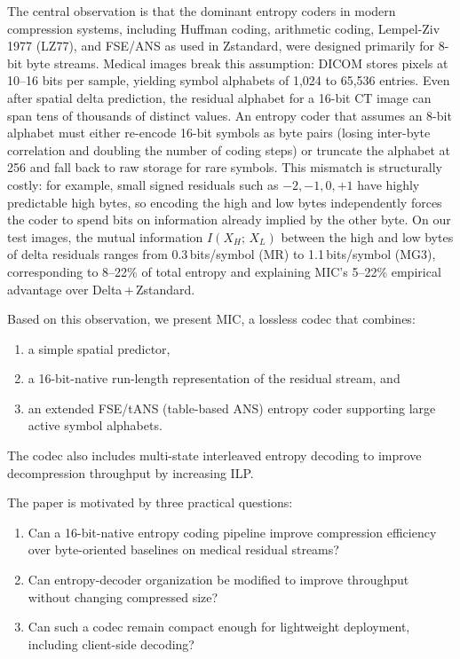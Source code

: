 \documentclass[journal]{IEEEtran}
\begin{document}
The central observation is that the dominant entropy coders in modern
compression systems, including Huffman coding, arithmetic coding, Lempel-Ziv
1977 (LZ77), and FSE/ANS as used in Zstandard, were designed primarily for
8-bit byte streams. Medical images break this assumption: DICOM stores pixels
at 10--16 bits per sample, yielding symbol alphabets of 1,024 to 65,536
entries. Even after spatial delta prediction, the residual alphabet for a
16-bit CT image can span tens of thousands of distinct values. An entropy coder
that assumes an 8-bit alphabet must either re-encode 16-bit symbols as byte
pairs (losing inter-byte correlation and doubling the number of coding steps)
or truncate the alphabet at 256 and fall back to raw storage for rare symbols.
This mismatch is structurally costly: for example, small signed residuals such
as $-2, -1, 0, +1$ have highly predictable high bytes, so encoding the high
and low bytes independently forces the coder to spend bits on information
already implied by the other byte. On our test images, the mutual information
$I(X_H;\,X_L)$ between the high and low bytes of delta residuals ranges from
0.3\,bits/symbol (MR) to 1.1\,bits/symbol (MG3), corresponding to 8--22\% of
total entropy and explaining MIC's 5--22\% empirical advantage over
Delta\,+\,Zstandard.

Based on this observation, we present MIC, a lossless codec that combines:
\begin{enumerate}
  \item a simple spatial predictor,
  \item a 16-bit-native run-length representation of the residual stream, and
  \item an extended FSE/tANS (table-based ANS) entropy coder supporting large
  active symbol alphabets.
\end{enumerate}

The codec also includes multi-state interleaved entropy decoding to improve
decompression throughput by increasing ILP.

The paper is motivated by three practical questions:
\begin{enumerate}
  \item Can a 16-bit-native entropy coding pipeline improve compression
  efficiency over byte-oriented baselines on medical residual streams?
  \item Can entropy-decoder organization be modified to improve throughput
  without changing compressed size?
  \item Can such a codec remain compact enough for lightweight deployment,
  including client-side decoding?
\end{enumerate}
\end{document}
